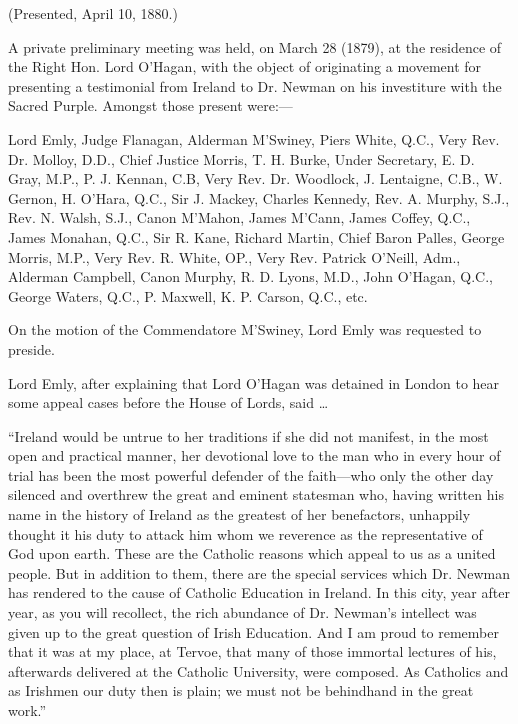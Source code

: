 
(Presented, April 10, 1880.)


A private preliminary meeting was held, on March 28 (1879), at the
residence of the Right Hon. Lord O'Hagan, with the object of
originating a movement for presenting a testimonial from Ireland to
Dr. Newman on his investiture with the Sacred Purple. Amongst those
present were:—

Lord Emly, Judge Flanagan, Alderman M'Swiney, Piers White, Q.C., Very
Rev. Dr. Molloy, D.D., Chief Justice Morris, T. H. Burke, Under
Secretary, E. D. Gray, M.P., P. J. Kennan, C.B, Very Rev. Dr. Woodlock,
J. Lentaigne, C.B., W. Gernon, H. O'Hara, Q.C., Sir J. Mackey, Charles
Kennedy, Rev. A. Murphy, S.J., Rev. N. Walsh, S.J., Canon M'Mahon,
James M'Cann, James Coffey, Q.C., James Monahan, Q.C., Sir R. Kane,
Richard Martin, Chief Baron Palles, George Morris, M.P., Very Rev. R.
White, OP., Very Rev. Patrick O'Neill,
Adm., Alderman Campbell, Canon Murphy, R. D. Lyons, M.D., John O'Hagan,
Q.C., George Waters, Q.C., P. Maxwell, K. P. Carson, Q.C., etc.

On the motion of the Commendatore M'Swiney, Lord Emly was requested
to preside.

Lord Emly, after explaining that Lord O'Hagan was detained in
London to hear some appeal cases before the House of Lords, said …

``Ireland would be untrue to her traditions if she did not
manifest, in the most open and practical manner, her devotional love
to the man who in every hour of trial has been the most powerful
defender of the faith—who only the other day silenced and overthrew
the great and eminent statesman who, having written his name in the
history of Ireland as the greatest of her benefactors, unhappily
thought it his duty to attack him whom we reverence as the
representative of God upon earth. These are the Catholic reasons which
appeal to us as a united people. But in addition to them, there are
the special services which Dr. Newman has rendered to the cause of
Catholic Education in Ireland. In this city, year after year, as you
will recollect, the rich abundance of Dr. Newman's intellect was given
up to the great question of Irish Education. And I am proud to
remember that it was at my place, at Tervoe, that many of those
immortal lectures of his, afterwards delivered at the Catholic
University, were composed. As Catholics and as Irishmen our duty then
is plain; we must not be behindhand in the great work.''


